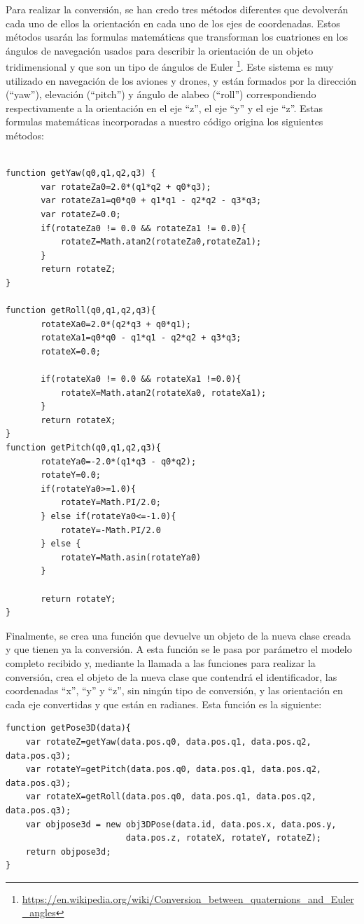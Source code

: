 Para realizar la conversión, se han credo tres métodos diferentes que devolverán cada uno de ellos la orientación en cada uno de los ejes de coordenadas. Estos métodos usarán las formulas matemáticas que transforman los cuatriones en los ángulos de navegación usados para describir la orientación de un objeto tridimensional y que son un tipo de ángulos de Euler \footnote{\url{https://en.wikipedia.org/wiki/Conversion_between_quaternions_and_Euler_angles}}. Este sistema es muy utilizado en navegación de los aviones y drones, y están formados por la dirección (``yaw''), elevación (``pitch'') y ángulo de alabeo (``roll'') correspondiendo respectivamente a la orientación en el eje ``z'', el eje ``y'' y el eje ``z''. Estas formulas matemáticas incorporadas a nuestro código origina los siguientes métodos:

\begin{lstlisting}[frame=single]

function getYaw(q0,q1,q2,q3) {
       var rotateZa0=2.0*(q1*q2 + q0*q3);
       var rotateZa1=q0*q0 + q1*q1 - q2*q2 - q3*q3;
       var rotateZ=0.0;
       if(rotateZa0 != 0.0 && rotateZa1 != 0.0){
           rotateZ=Math.atan2(rotateZa0,rotateZa1);
       }
       return rotateZ;
}

function getRoll(q0,q1,q2,q3){
       rotateXa0=2.0*(q2*q3 + q0*q1);
       rotateXa1=q0*q0 - q1*q1 - q2*q2 + q3*q3;
       rotateX=0.0;

       if(rotateXa0 != 0.0 && rotateXa1 !=0.0){
           rotateX=Math.atan2(rotateXa0, rotateXa1);
       }
       return rotateX;
}
function getPitch(q0,q1,q2,q3){
       rotateYa0=-2.0*(q1*q3 - q0*q2);
       rotateY=0.0;
       if(rotateYa0>=1.0){
           rotateY=Math.PI/2.0;
       } else if(rotateYa0<=-1.0){
           rotateY=-Math.PI/2.0
       } else {
           rotateY=Math.asin(rotateYa0)
       }

       return rotateY;
}
\end{lstlisting}

Finalmente, se crea una función que devuelve un objeto de la nueva clase creada y que tienen ya la conversión. A esta función se le pasa por parámetro el modelo completo recibido y, mediante la llamada a las funciones para realizar la conversión, crea el objeto de la nueva clase que contendrá el identificador, las coordenadas ``x'', ``y'' y ``z'', sin ningún tipo de conversión, y las orientación en cada eje convertidas y que están en radianes. Esta función es la siguiente:

\begin{lstlisting}[frame=single]
function getPose3D(data){
	var rotateZ=getYaw(data.pos.q0, data.pos.q1, data.pos.q2, data.pos.q3);
	var rotateY=getPitch(data.pos.q0, data.pos.q1, data.pos.q2, data.pos.q3);
	var rotateX=getRoll(data.pos.q0, data.pos.q1, data.pos.q2, data.pos.q3);
	var objpose3d = new obj3DPose(data.id, data.pos.x, data.pos.y,
						data.pos.z, rotateX, rotateY, rotateZ);
	return objpose3d;
}
\end{lstlisting}

